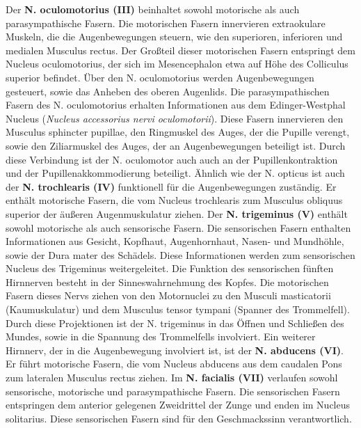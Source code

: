 \documentclass[12pt,a4paper,pdftex]{article}
\begin{document}
\noindent Der \textbf{N. oculomotorius (III)} beinhaltet sowohl motorische als auch parasympathische Fasern. Die motorischen Fasern innervieren extraokulare Muskeln, die die Augenbewegungen steuern, wie den superioren, inferioren und medialen Musculus rectus. Der Großteil dieser motorischen Fasern entspringt dem Nucleus oculomotorius, der sich im Mesencephalon etwa auf Höhe des Colliculus superior befindet. Über den N. oculomotorius werden Augenbewegungen gesteuert, sowie das Anheben des oberen Augenlids. Die parasympathischen Fasern des N. oculomotorius erhalten Informationen aus dem Edinger-Westphal Nucleus (\textit{Nucleus accessorius nervi oculomotorii}). Diese Fasern innervieren den Musculus sphincter pupillae, den Ringmuskel des Auges, der die Pupille verengt, sowie den Ziliarmuskel des Auges, der an Augenbewegungen beteiligt ist. Durch diese Verbindung ist der N. oculomotor auch auch an der Pupillenkontraktion und der Pupillenakkommodierung beteiligt. Ähnlich wie der N. opticus ist auch der \textbf{N. trochlearis (IV)} funktionell für die Augenbewegungen zuständig. Er enthält motorische Fasern, die vom Nucleus trochlearis zum Musculus obliquus superior der äußeren Augenmuskulatur ziehen. Der \textbf{N. trigeminus (V)} enthält sowohl motorische als auch sensorische Fasern. Die sensorischen Fasern enthalten Informationen aus Gesicht, Kopfhaut, Augenhornhaut, Nasen- und Mundhöhle, sowie der Dura mater des Schädels. Diese Informationen werden zum sensorischen Nucleus des Trigeminus weitergeleitet. Die Funktion des sensorischen fünften Hirnnerven besteht in der Sinneswahrnehmung des Kopfes. Die motorischen Fasern dieses Nervs ziehen von den Motornuclei zu den Musculi masticatorii (Kaumuskulatur) und dem Musculus tensor tympani (Spanner des Trommelfell). Durch diese Projektionen ist der N. trigeminus in das Öffnen und Schließen des Mundes, sowie in die Spannung des Trommelfells involviert. Ein weiterer Hirnnerv, der in die Augenbewegung involviert ist, ist der \textbf{N. abducens (VI)}. Er führt motorische Fasern, die vom Nucleus abducens aus dem caudalen Pons zum lateralen Musculus rectus ziehen. Im \textbf{N. facialis (VII)} verlaufen sowohl sensorische, motorische und parasympathische Fasern. Die sensorischen Fasern entspringen dem anterior gelegenen Zweidrittel der Zunge und enden im Nucleus solitarius. Diese sensorischen Fasern sind für den Geschmackssinn verantwortlich. 
\end{document}
